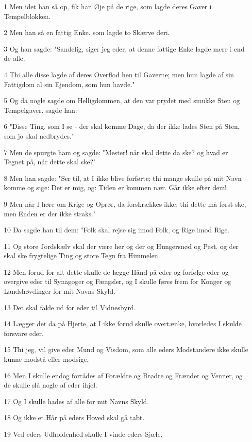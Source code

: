 \par 1 Men idet han så op, fik han Øje på de rige, som lagde deres Gaver i Tempelblokken.
\par 2 Men han så en fattig Enke. som lagde to Skærve deri.
\par 3 Og han sagde: "Sandelig, siger jeg eder, at denne fattige Enke lagde mere i end de alle.
\par 4 Thi alle disse lagde af deres Overflod hen til Gaverne; men hun lagde af sin Fattigdom al sin Ejendom, som hun havde."
\par 5 Og da nogle sagde om Helligdommen, at den var prydet med smukke Sten og Tempelgaver. sagde han:
\par 6 "Disse Ting, som I se - der skal komme Dage, da der ikke lades Sten på Sten, som jo skal nedbrydes."
\par 7 Men de spurgte ham og sagde: "Mester! når skal dette da ske? og hvad er Tegnet på, når dette skal ske?"
\par 8 Men han sagde: "Ser til, at I ikke blive forførte; thi mange skulle på mit Navn komme og sige: Det er mig, og: Tiden er kommen nær. Går ikke efter dem!
\par 9 Men når I høre om Krige og Oprør, da forskrækkes ikke; thi dette må først ske, men Enden er der ikke straks."
\par 10 Da sagde han til dem: "Folk skal rejse sig imod Folk, og Rige imod Rige.
\par 11 Og store Jordskælv skal der være her og der og Hungersnød og Pest, og der skal ske frygtelige Ting og store Tegn fra Himmelen.
\par 12 Men forud for alt dette skulle de lægge Hånd på eder og forfølge eder og overgive eder til Synagoger og Fængsler, og I skulle føres frem for Konger og Landshøvdinger for mit Navns Skyld.
\par 13 Det skal falde ud for eder til Vidnesbyrd.
\par 14 Lægger det da på Hjerte, at I ikke forud skulle overtænke, hvorledes I skulde forsvare eder.
\par 15 Thi jeg, vil give eder Mund og Visdom, som alle eders Modstandere ikke skulle kunne modstå eller modsige.
\par 16 Men I skulle endog forrådes af Forældre og Brødre og Frænder og Venner, og de skulle slå nogle af eder ihjel.
\par 17 Og I skulle hades af alle for mit Navns Skyld.
\par 18 Og ikke et Hår på eders Hoved skal gå tabt.
\par 19 Ved eders Udholdenhed skulle I vinde eders Sjæle.

